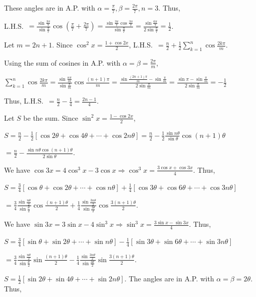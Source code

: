   These angles are in A.P. with $\alpha = \frac{\pi}{7}, \beta = \frac{2\pi}{7}, n = 3$. Thus,

  L.H.S.\ $= \frac{\sin\frac{3\pi}{7}}{\sin\frac{\pi}{7}}\cos\left(\frac{\pi}{7} + \frac{2\pi}{7}\right) =
  \frac{\sin\frac{3\pi}{7}\cos\frac{3\pi}{7}}{\sin\frac{\pi}{7}} = \frac{\sin\frac{6\pi}{7}}{2\sin\frac{\pi}{7}}
  = \frac{1}{2}$.
\item Let $m = 2n + 1$. Since $\cos^2x = \frac{1 + \cos2x}{2}$, L.H.S.\ $= \frac{n}{2} +
  \frac{1}{2}\displaystyle\sum_{k = 1}^n\cos\frac{2k\pi}{m}$.

  Using the sum of cosines in A.P. with $\alpha = \beta = \frac{2\pi}{m}$,

  $\displaystyle\sum_{k = 1}^n\cos\frac{2k\pi}{m} = \frac{\sin\frac{n\pi}{m}}{\sin\frac{\pi}{m}}\cos\frac{(n +
    1)\pi}{m} = \frac{\sin\frac{(2n + 1)\pi}{m} - \sin\frac{\pi}{m}}{2\sin\frac{\pi}{m}} = \frac{\sin\pi -
    \sin\frac{\pi}{m}}{2\sin\frac{\pi}{m}} = -\frac{1}{2}$

  Thus, L.H.S.\ $= \frac{n}{2} - \frac{1}{4} = \frac{2n - 1}{4}$.
\item Let $S$ be the sum. Since $\sin^2x = \frac{1 - \cos2x}{2}$,

  $S = \frac{n}{2} - \frac{1}{2}[\cos2\theta + \cos4\theta + \cdots + \cos2n\theta] = \frac{n}{2} -
  \frac{1}{2}\frac{\sin n\theta}{\sin\theta}\cos(n + 1)\theta$

  $= \frac{n}{2} - \frac{\sin n\theta\cos(n + 1)\theta}{2\sin\theta}$.
\item We have $\cos3x = 4\cos^3x - 3\cos x \Rightarrow \cos^3x = \frac{3\cos x + \cos3x}{4}$. Thus,

  $S = \frac{3}{4}[\cos\theta + \cos2\theta + \cdots + \cos n\theta] + \frac{1}{4}[\cos3\theta +
  \cos6\theta + \cdots + \cos3n\theta]$

  $= \frac{3}{4}\frac{\sin\frac{n\theta}{2}}{\sin\frac{\theta}{2}}\cos\frac{(n + 1)\theta}{2} +
  \frac{1}{4}\frac{\sin\frac{3n\theta}{2}}{\sin\frac{3\theta}{2}}\cos\frac{3(n + 1)\theta}{2}$.
\item We have $\sin3x = 3\sin x - 4\sin^3x \Rightarrow \sin^3x = \frac{3\sin x - \sin3x}{4}$. Thus,

  $S = \frac{3}{4}[\sin\theta + \sin2\theta + \cdots + \sin n\theta] - \frac{1}{4}[\sin3\theta +
  \sin6\theta + \cdots + \sin3n\theta]$

  $= \frac{3}{4}\frac{\sin\frac{n\theta}{2}}{\sin\frac{\theta}{2}}\sin\frac{(n + 1)\theta}{2} -
  \frac{1}{4}\frac{\sin\frac{3n\theta}{2}}{\sin\frac{3\theta}{2}}\sin\frac{3(n + 1)\theta}{2}$.
\item $S = \frac{1}{2}[\sin2\theta + \sin4\theta + \cdots + \sin2n\theta]$. The angles are in A.P. with
  $\alpha = \beta = 2\theta$. Thus,


